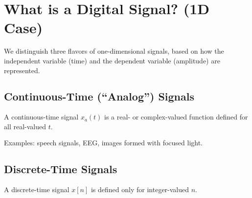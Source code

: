 \documentclass[handout_subfiles_root.tex]{subfiles}
\begin{document}
\maketitle

\section{What is a Digital Signal? (1D Case)}

We distinguish three flavors of one-dimensional signals, based on how the
independent variable (time) and the dependent variable (amplitude) are
represented.

\subsection{Continuous-Time (``Analog'') Signals}

A continuous-time signal $x_a(t)$ is a real- or complex-valued function
defined for all real-valued $t$.

\begin{center}
\end{center}

\noindent Examples: speech signals, EEG, images formed with focused light.

\subsection{Discrete-Time Signals}

A discrete-time signal $x[n]$ is defined only for integer-valued $n$.

\begin{center}
\end{center}
\end{document}
